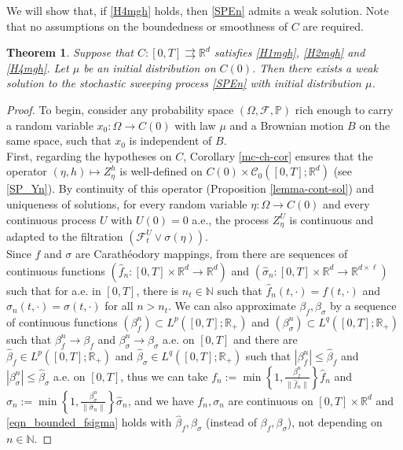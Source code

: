 \documentclass[preprint,12pt]{elsarticle}
\newcommand{\R}{\mathbb{R}}
\newcommand{\N}{\mathbb{N}}
\newcommand{\tto}{\rightrightarrows}
\theoremstyle{plain}
\newtheorem{theorem}{Theorem}[section]
\theoremstyle{definition}
\theoremstyle{remark}
\begin{document}
    We will show that, if \ref{H4mgh} holds, then \eqref{SPEn} admits a weak solution. Note that no assumptions on the boundedness or smoothness of $C$ are required.
	
	\begin{theorem}\label{weak-existence}
		Suppose that $C\colon [0,T]\tto \R^d$ satisfies \ref{H1mgh}, \ref{H2mgh} and \ref{H4mgh}. Let $\mu$ be an initial distribution on $C(0)$. Then there exists a weak solution to the stochastic sweeping process \eqref{SPEn} with initial distribution $\mu$.
	\end{theorem}
	\begin{proof} 
To begin, consider any probability space $(\Omega,\mathcal{F},\mathbb{P})$ rich enough to carry a random variable $x_0\colon \Omega\to C(0)$ with law $\mu$ and a Brownian motion $B$ on the same space, such that $x_0$ is independent of $B$.\\
First, regarding the hypotheses on $C$, Corollary \ref{mc-ch-cor} ensures that the operator $(\eta,h)\mapsto Z^h_\eta$ is well-defined on $C(0)\times \mathcal{C}_0([0,T]; \mathbb{R}^d)$ (see \eqref{SP_Yn}). By continuity of this operator (Proposition \ref{lemma-cont-sol}) and uniqueness of solutions, for every random variable $\eta\colon \Omega\to C(0)$ and every continuous process $U$ with $U(0) = 0$ a.e.,  the process $Z^U_\eta$ is continuous and adapted to the filtration $(\mathcal{F}^U_t\vee\sigma(\eta))$.\\
Since $f$ and $\sigma$ are Carathéodory mappings, from \cite[Theorem 2.3]{Kubinska2004} there are sequences of continuous functions $(\hat{f}_n\colon [0,T]\times \R^d\to \R^d)$ and $(\hat{\sigma}_n\colon [0,T]\times \R^d\to \R^{d\times\ell})$ such that for a.e. in $[0,T]$, there is $n_t\in\N$ such that $\hat{f}_n(t,\cdot) = f(t,\cdot)$ and $\hat{\sigma}_n(t,\cdot) = \sigma(t,\cdot)$ for all $n>n_t$. We can also approximate $\beta_f, \beta_\sigma$ by a sequence of continuous functions $(\beta_f^n)\subset L^p([0,T];\R_+)$ and $(\beta_\sigma^n)\subset L^q([0,T];\R_+)$ such that $\beta_f^n\to \beta_f$ and $\beta_\sigma^n\to \beta_\sigma$ a.e. on $[0,T]$ and there are $\hat\beta_f\in L^p([0,T];\R_+)$ and $\hat\beta_\sigma\in L^q([0,T];\R_+)$ such that $|\beta_f^n|\leq \hat{\beta}_f$ and $|\beta_\sigma^n|\leq \hat\beta_\sigma$ a.e. on $[0,T]$, thus we can take $f_n := \min\left\{1,\frac{\beta_f^n}{\|\hat f_n\|}\right\}\hat f_n$ and  $\sigma_n := \min\left\{1,\frac{\beta_\sigma^n}{\|\hat\sigma_n\|}\right\}\hat{\sigma}_n$, and we have $f_n,\sigma_n$ are continuous on $[0,T]\times \R^d$ and \eqref{eqn_bounded_fsigma} holds with $\hat{\beta}_f, \hat\beta_\sigma$ (instead of $\beta_f, \beta_\sigma$), not depending on $n\in \N$.


\end{proof}
\end{document}
